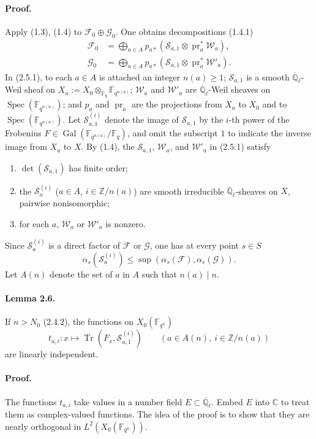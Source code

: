 \documentclass[11pt]{article}
\newcommand{\F}{\mathbb{F}}
\newcommand{\Z}{\mathbb{Z}}
\newcommand{\Ql}{\overline{\mathbb Q}_{\ell}}
\newcommand{\Tr}{\operatorname{Tr}}
\newcommand{\Spec}{\operatorname{Spec}}
\newcommand{\Gal}{\operatorname{Gal}}
\newcommand{\pr}{\operatorname{pr}}
\begin{document}
\paragraph{Proof.}
Apply (1.3), (1.4) to $\mathcal F_0\oplus\mathcal G_0$.
One obtains decompositions (1.4.1)
\begin{align}
 \mathcal F_0&=\bigoplus_{a\in A}p_{a*}\left(\mathcal S_{a,1}\otimes\pr_a^*\mathcal W_a\right),\tag{2.5.1}\\
 \mathcal G_0&=\bigoplus_{a\in A}p_{a*}\left(\mathcal S_{a,1}\otimes\pr_a^*\mathcal W'_a\right).
\end{align}
In (2.5.1), to each $a\in A$ is attached an integer $n(a)\ge1$; $\mathcal S_{a,1}$ is a smooth $\Ql$-Weil sheaf on $X_a:=X_0\otimes_{\F_q}\F_{q^{n(a)}}$; $\mathcal W_a$ and $\mathcal W'_a$ are $\Ql$-Weil sheaves on $\Spec(\F_{q^{n(a)}})$; and $p_a$ and $\pr_a$ are the projections from $X_a$ to $X_0$ and to $\Spec(\F_{q^{n(a)}})$.
Let $\mathcal S_{a,1}^{(i)}$ denote the image of $\mathcal S_{a,1}$ by the $i$-th power of the Frobenius $F\in\Gal(\F_{q^{n(a)}}/\F_q)$, and omit the subscript $1$ to indicate the inverse image from $X_a$ to $X$.
By (1.4), the $\mathcal S_{a,1}$, $\mathcal W_a$, and $\mathcal W'_a$ in (2.5.1) satisfy
\begin{enumerate}[label=(\roman*)]
\item $\det(\mathcal S_{a,1})$ has finite order;
\item the $\mathcal S_a^{(i)}$ ($a\in A$, $i\in\Z/n(a)$) are smooth irreducible $\Ql$-sheaves on $X$, pairwise nonisomorphic;
\item for each $a$, $\mathcal W_a$ or $\mathcal W'_a$ is nonzero.
\end{enumerate}
Since $\mathcal S_a^{(i)}$ is a direct factor of $\mathcal F$ or $\mathcal G$, one has at every point $s\in S$
\[
 \alpha_s(\mathcal S_a^{(i)})\le \sup(\alpha_s(\mathcal F),\alpha_s(\mathcal G)).
\]
Let $A(n)$ denote the set of $a$ in $A$ such that $n(a)\mid n$.

\paragraph{Lemma 2.6.}
If $n>N_0$ (2.4.2), the functions on $X_0(\F_{q^n})$
\[
 t_{a,i}:x\longmapsto \Tr(F_x,\mathcal S_{a,1}^{(i)})\qquad (a\in A(n),\ i\in\Z/n(a))
\]
are linearly independent.

\paragraph{Proof.}
The functions $t_{a,i}$ take values in a number field $E\subset\Ql$.
Embed $E$ into $\mathbb C$ to treat them as complex-valued functions.
The idea of the proof is to show that they are nearly orthogonal in $L^2(X_0(\F_{q^n}))$.
\end{document}
